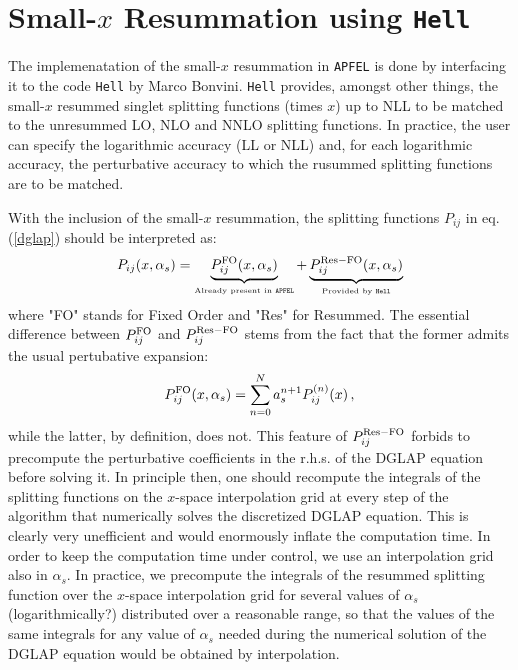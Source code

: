 \documentclass[10pt,a4paper]{article}
\begin{document}
\section{Small-$x$ Resummation using {\tt Hell}}

The implemenatation of the small-$x$ resummation in {\tt APFEL} is
done by interfacing it to the code {\tt Hell} by Marco Bonvini. {\tt Hell}
provides, amongst other things, the small-$x$ resummed singlet splitting
functions (times $x$) up to NLL to be matched to the unresummed LO, NLO and NNLO
splitting functions. In practice, the user can specify the logarithmic
accuracy (LL or NLL) and, for each logarithmic accuracy, the
perturbative accuracy to which the rusummed splitting functions are to
be matched.

With the inclusion of the small-$x$ resummation, the splitting
functions ${P}_{ij}$ in eq. (\ref{dglap}) should be interpreted
as:
\begin{equation}
{P}_{ij}(x,\alpha_s) = \underbrace{{P}_{ij}^{\rm
    FO}(x,\alpha_s)}_{\mbox{\tiny Already present in {\tt APFEL}}} +
\underbrace{{P}_{ij}^{\rm Res-FO}(x,\alpha_s)}_{\mbox{\tiny Provided
    by {\tt Hell}}}
\label{ResummedSplittings}
\end{equation}
where "FO" stands for Fixed Order and "Res" for Resummed.
The essential difference between ${P}_{ij}^{\rm FO}$ and
${P}_{ij}^{\rm Res-FO}$ stems from the fact that the former admits the
usual pertubative expansion:
\begin{equation}
{P}_{ij}^{\rm FO}(x,\alpha_s) = \sum_{n=0}^N a_s^{n+1} P_{ij}^{(n)}(x)\,,
\end{equation}
while the latter, by definition, does not. This feature of
${P}_{ij}^{\rm Res-FO}$ forbids to precompute the perturbative
coefficients in the r.h.s. of the DGLAP equation before solving it. In principle then,
one should recompute the integrals of the splitting functions on the $x$-space
interpolation grid at every step of the algorithm that numerically
solves the discretized DGLAP equation. This is clearly very
unefficient and would enormously inflate the computation time. In
order to keep the computation time under control, we use
an interpolation grid also in $\alpha_s$. In practice, we precompute
the integrals of the resummed splitting function over the $x$-space
interpolation grid for several values of $\alpha_s$ (logarithmically?)
distributed over a reasonable range, so that the values of the same
integrals for any value of $\alpha_s$ needed during the numerical
solution of the DGLAP equation  would be obtained by interpolation.
\end{document}
